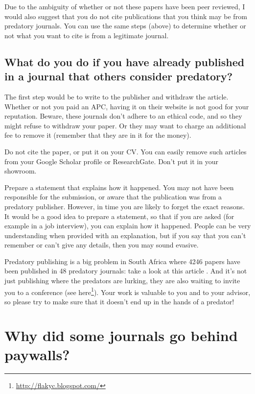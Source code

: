 \documentclass[
]{krantz}
\renewcommand{\href}[2]{#2\footnote{\url{#1}}}
\begin{document}
Due to the ambiguity of whether or not these papers have been peer reviewed, I would also suggest that you do not cite publications that you think may be from predatory journals. You can use the same steps (above) to determine whether or not what you want to cite is from a legitimate journal.

\hypertarget{what-do-you-do-if-you-have-already-published-in-a-journal-that-others-consider-predatory}{%
\section{What do you do if you have already published in a journal that others consider predatory?}\label{what-do-you-do-if-you-have-already-published-in-a-journal-that-others-consider-predatory}}

The first step would be to write to the publisher and withdraw the article. Whether or not you paid an APC, having it on their website is not good for your reputation. Beware, these journals don't adhere to an ethical code, and so they might refuse to withdraw your paper. Or they may want to charge an additional fee to remove it (remember that they are in it for the money).

Do not cite the paper, or put it on your CV. You can easily remove such articles from your Google Scholar profile or ResearchGate. Don't put it in your showroom.

Prepare a statement that explains how it happened. You may not have been responsible for the submission, or aware that the publication was from a predatory publisher. However, in time you are likely to forget the exact reasons. It would be a good idea to prepare a statement, so that if you are asked (for example in a job interview), you can explain how it happened. People can be very understanding when provided with an explanation, but if you say that you can't remember or can't give any details, then you may sound evasive.

Predatory publishing is a big problem in South Africa where 4246 papers have been published in 48 predatory journals: take a look at this article \citep{mouton2017extent}. And it's not just publishing where the predators are lurking, they are also waiting to invite you to a conference (see \href{http://flakyc.blogspot.com/}{here}). Your work is valuable to you and to your advisor, so please try to make sure that it doesn't end up in the hands of a predator!

\hypertarget{paywall2}{%
\chapter{Why did some journals go behind paywalls?}\label{paywall2}}
\end{document}
